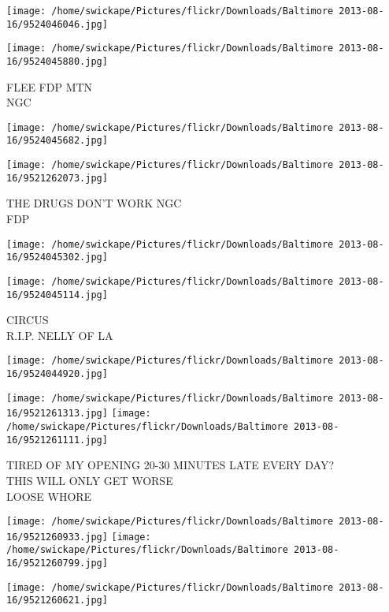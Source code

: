 \documentclass[10pt,letterpaper]{article}
\begin{document}
\texttt{[image: /home/swickape/Pictures/flickr/Downloads/Baltimore 2013-08-16/9524046046.jpg]}

\vspace{0.25in}
\texttt{[image: /home/swickape/Pictures/flickr/Downloads/Baltimore 2013-08-16/9524045880.jpg]}

FLEE FDP MTN\\
NGC\\
\pagebreak

\texttt{[image: /home/swickape/Pictures/flickr/Downloads/Baltimore 2013-08-16/9524045682.jpg]}

\vspace{0.25in}
\texttt{[image: /home/swickape/Pictures/flickr/Downloads/Baltimore 2013-08-16/9521262073.jpg]}

THE DRUGS DON'T WORK NGC\\
FDP\\
\pagebreak

\texttt{[image: /home/swickape/Pictures/flickr/Downloads/Baltimore 2013-08-16/9524045302.jpg]}

\vspace{0.25in}
\texttt{[image: /home/swickape/Pictures/flickr/Downloads/Baltimore 2013-08-16/9524045114.jpg]}

CIRCUS\\
R.I.P. NELLY OF LA\\
\pagebreak

\texttt{[image: /home/swickape/Pictures/flickr/Downloads/Baltimore 2013-08-16/9524044920.jpg]}

\vspace{0.25in}
\texttt{[image: /home/swickape/Pictures/flickr/Downloads/Baltimore 2013-08-16/9521261313.jpg]}
\texttt{[image: /home/swickape/Pictures/flickr/Downloads/Baltimore 2013-08-16/9521261111.jpg]}

TIRED OF MY OPENING 20{-}30 MINUTES LATE EVERY DAY?\\
THIS WILL ONLY GET WORSE\\
LOOSE WHORE\\
\pagebreak

\texttt{[image: /home/swickape/Pictures/flickr/Downloads/Baltimore 2013-08-16/9521260933.jpg]}
\texttt{[image: /home/swickape/Pictures/flickr/Downloads/Baltimore 2013-08-16/9521260799.jpg]}

\texttt{[image: /home/swickape/Pictures/flickr/Downloads/Baltimore 2013-08-16/9521260621.jpg]}
\end{document}
